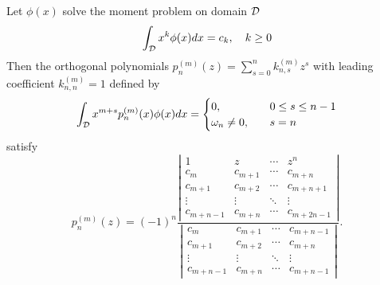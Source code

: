 \begin{lemma}
    Let $\phi(x)$ solve the moment problem on domain $\mathcal D$
        $$\int_{\mathcal D} x^k \phi(x) dx = c_k,\quad k\ge 0 $$
    Then the orthogonal polynomials
     $p_{n}^{(m)}(z) = \sum_{s = 0}^{n} k_{n, s}^{(m)} z^s$ with leading coefficient $k_{n,n}^{(m)} = 1$ defined by 
    \begin{equation}
        \int_{\mathcal D} x^{m+s} p_n^{(m)}(x) \phi(x) dx = \begin{cases}
            0,\quad &0\le s\le n-1 \\
            \omega_n\neq 0,\quad &s = n
        \end{cases}
    \end{equation}
    satisfy
    \begin{equation}
        p_n^{(m)}(z) = (-1)^n \frac{\left|\begin{matrix}
            1 & z & \cdots & z^n \\
            c_m & c_{m+1} & \cdots & c_{m+n}\\
            c_{m+1} & c_{m+2} & \cdots & c_{m+n+1}\\
            \vdots & \vdots & \ddots & \vdots \\
            c_{m+n-1} & c_{m+n} & \cdots & c_{m+2n-1} 
        \end{matrix}\right|}{\left| \begin{matrix}
            c_m & c_{m+1} & \cdots & c_{m+n-1} \\
            c_{m+1} & c_{m+2} & \cdots & c_{m+n} \\ 
            \vdots & \vdots & \ddots & \vdots \\
            c_{m+n-1} & c_{m+n} & \cdots & c_{m+n-1}
        \end{matrix}\right|} .
    \end{equation}
\end{lemma}
